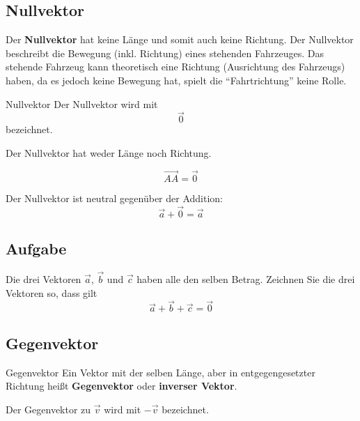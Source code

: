 \newpage

\subsection{Nullvektor}

Der \textbf{Nullvektor} hat keine Länge und somit auch keine
Richtung. Der Nullvektor beschreibt \zB die Bewegung (inkl.
Richtung) eines stehenden Fahrzeuges.
Das stehende Fahrzeug kann theoretisch eine Richtung (Ausrichtung des
Fahrzeugs) haben, da es jedoch keine Bewegung hat, spielt die
``Fahrtrichtung'' keine Rolle.

\begin{definition}{Nullvektor}{}
  Der Nullvektor wird mit
  $$\overrightarrow{0}$$
  bezeichnet.

  Der Nullvektor hat weder Länge noch Richtung.
\end{definition}

\begin{gesetz}{}{}
  $$\overrightarrow{AA} = \overrightarrow{0}$$
  \end{gesetz}

\begin{bemerkung}{}{}
  Der Nullvektor ist neutral gegenüber der Addition:
  $$\vec{a} + \overrightarrow{0}  = \vec{a}$$
\end{bemerkung}

\subsection*{Aufgabe}
Die drei Vektoren $\vec{a}$, $\vec{b}$ und $\vec{c}$ haben alle den
selben Betrag. Zeichnen Sie die drei Vektoren so, dass
gilt $$\vec{a}+\vec{b}+\vec{c} = \overrightarrow{0}$$

\newpage


\subsection{Gegenvektor}

\begin{definition}{Gegenvektor}{}
  Ein Vektor mit der selben Länge, aber in entgegengesetzter Richtung
  heißt \textbf{Gegenvektor} oder \textbf{inverser Vektor}.

  Der Gegenvektor zu $\vec{v}$ wird mit $-\vec{v}$ bezeichnet.
\end{definition}

